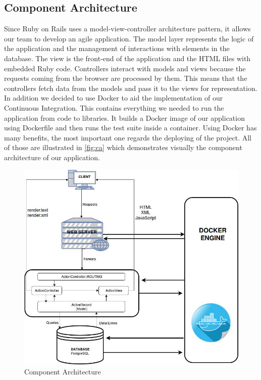\documentclass{l3proj}
\begin{document}
\subsection{Component Architecture}
\label{sec:component}

Since Ruby on Rails uses a model-view-controller architecture pattern, it allows our team to develop an agile application. The model layer represents the logic of the application and the management of interactions with elements in the database. The view is the front-end of the application and the HTML files with embedded Ruby code. Controllers interact with models and views because the requests coming from the browser are processed by them. This means that the controllers fetch data from the models and pass it to the views for representation.
In addition we decided to use Docker \cite{Docker} to aid the implementation of our Continuous Integration. This contains everything we needed to run the application from code to libraries. It builds a Docker image of our application using Dockerfile and then runs the test suite inside a container. Using Docker has many benefits, the most important one regards the deploying of the project.
All of those are illustrated in \autoref{fig:ca} which demonstrates visually the component architecture of our application.

\begin{figure}[ht]
\centerline{\includegraphics[width=\textwidth, height=\textheight, keepaspectratio]{component.png}}
\caption{Component Architecture}
\label{fig:ca}
\end{figure}
\end{document}
